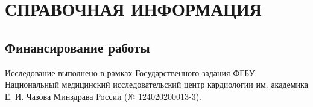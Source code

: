 \section{СПРАВОЧНАЯ ИНФОРМАЦИЯ}

\subsection{Финансирование работы}

Исследование выполнено в рамках Государственного задания ФГБУ
Национальный медицинский исследовательский центр кардиологии им. академика Е.
И. Чазова Минздрава России (№ 124020200013-3).